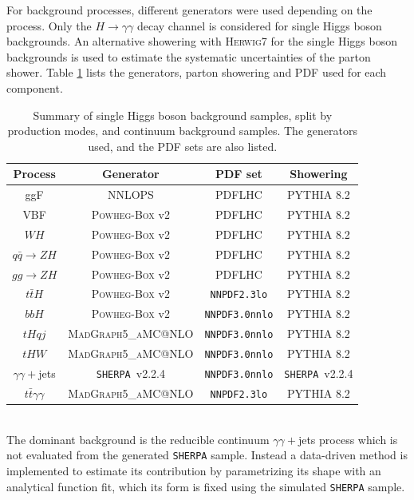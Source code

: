 For background processes, different generators were used depending on the process. Only the $H\to\gamma\gamma$ decay channel is considered for single Higgs boson backgrounds. An alternative showering with \textsc{Herwig}7 for the single Higgs boson backgrounds is used to estimate the systematic uncertainties of the parton shower. Table \ref{tab:HHyybb:Data&MC:Samples} lists the generators, parton showering and PDF used for each component. 
\begin{table}[htbp]
  \centering
    \begin{tabular}{ cccc }
    \hline\hline
    Process & Generator & PDF set  & Showering    \\
       \hline
        ggF  & NNLOPS & PDFLHC &  \textsc{PYTHIA} 8.2  \\
        VBF & \textsc{Powheg-Box} v2 & PDFLHC  &  \textsc{PYTHIA} 8.2        \\
        $WH$ & \textsc{Powheg-Box} v2 & PDFLHC  &  \textsc{PYTHIA} 8.2 \\
        $q\bar{q}\to ZH$ & \textsc{Powheg-Box} v2 &  PDFLHC  &  \textsc{PYTHIA} 8.2 \\
        $gg\to ZH$ &  \textsc{Powheg-Box} v2 & PDFLHC  &  \textsc{PYTHIA} 8.2  \\
        $t\bar{t}H$ & \textsc{Powheg-Box} v2 & \texttt{NNPDF2.3lo} & \textsc{PYTHIA} 8.2  \\
        $bbH$ &  \textsc{Powheg-Box} v2 & \texttt{NNPDF3.0nnlo}  &  \textsc{PYTHIA} 8.2     \\
        $tHqj$ & \textsc{MadGraph5\_aMC@NLO} &  \texttt{NNPDF3.0nnlo}  & \textsc{PYTHIA} 8.2   \\
        $tHW$  & \textsc{MadGraph5\_aMC@NLO} &  \texttt{NNPDF3.0nnlo}  & \textsc{PYTHIA} 8.2   \\
         $\gamma\gamma+$jets &   \texttt{SHERPA}~v2.2.4 & \texttt{NNPDF3.0nnlo}  &  \texttt{SHERPA}~v2.2.4  \\
         $t\bar{t} \gamma \gamma$ & \textsc{MadGraph5\_aMC@NLO}  &  \texttt{NNPDF2.3lo} & \textsc{PYTHIA} 8.2 \\
        \hline\hline
    \end{tabular}
    \caption{Summary of single Higgs boson background samples, split by production modes, and continuum background samples. The generators used, and the PDF sets are also listed. }
  \label{tab:HHyybb:Data&MC:Samples}
\end{table}
\\
The dominant background is the reducible continuum $\gamma\gamma+$jets process which is not evaluated from the generated \texttt{SHERPA} sample. Instead a data-driven method is implemented to estimate its contribution by parametrizing its shape with an analytical function fit, which its form is fixed using the simulated \texttt{SHERPA} sample.

